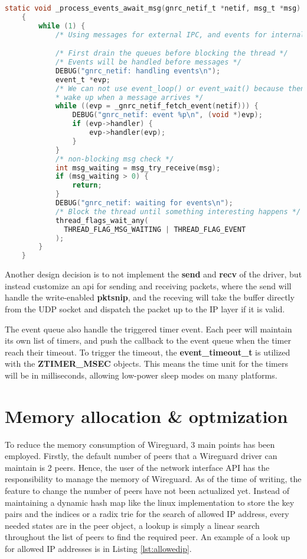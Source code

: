   \begin{lstlisting}[caption = Netif event handler,language=C, label={lst:netifev}]
    static void _process_events_await_msg(gnrc_netif_t *netif, msg_t *msg)
    {
        while (1) {
            /* Using messages for external IPC, and events for internal events */

            /* First drain the queues before blocking the thread */
            /* Events will be handled before messages */
            DEBUG("gnrc_netif: handling events\n");
            event_t *evp;
            /* We can not use event_loop() or event_wait() because then we would not
            * wake up when a message arrives */
            while ((evp = _gnrc_netif_fetch_event(netif))) {
                DEBUG("gnrc_netif: event %p\n", (void *)evp);
                if (evp->handler) {
                    evp->handler(evp);
                }
            }
            /* non-blocking msg check */
            int msg_waiting = msg_try_receive(msg);
            if (msg_waiting > 0) {
                return;
            }
            DEBUG("gnrc_netif: waiting for events\n");
            /* Block the thread until something interesting happens */
            thread_flags_wait_any(
              THREAD_FLAG_MSG_WAITING | THREAD_FLAG_EVENT
            );
        }
    }
  \end{lstlisting}

  Another design decision is to not implement the \textbf{send} and \textbf{recv} of the driver, but instead 
  customize an api for sending and receiving packets, where the send will handle the write-enabled 
  \textbf{pktsnip}, and the receving will take the buffer directly from the UDP socket and dispatch the packet 
  up to the IP layer if it is valid.

  The event queue also handle the triggered timer event. Each peer will maintain its own list 
  of timers, and push the callback to the event queue when the timer reach their timeout. 
  To trigger the timeout, the \textbf{event{\_}timeout{\_}t} is utilized with the \textbf{ZTIMER{\_}MSEC}
  objects. This means the time unit for the timers will be in milliseconds, allowing low-power
  sleep modes on many platforms.
\section{Memory allocation \& optmization}
  To reduce the memory consumption of Wireguard, 3 main points has been employed. Firstly, the default number
  of peers that a Wireguard driver can maintain is 2 peers. Hence, the user of the network interface
  API has the responsibility to manage the memory of Wireguard. As of the time of writing, the 
  feature to change the number of peers have not been actualized yet. Instead of maintaining
  a dynamic hash map like the linux implementation to store the key pairs and the indices
  or a radix trie for the search of allowed IP address, 
  every needed states are in the peer object, a lookup is simply a linear search throughout the list of
  peers to find the required peer. An example of a look up for allowed IP addresses is in Listing \ref{lst:allowedip}.

